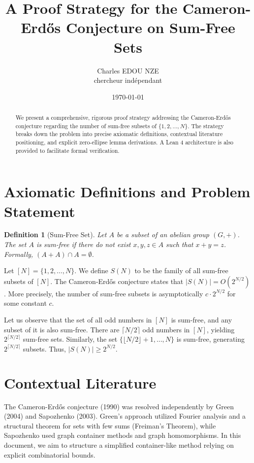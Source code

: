 \documentclass[11pt,a4paper]{article}
\title{A Proof Strategy for the Cameron-Erd\H{o}s Conjecture on Sum-Free Sets}
\author{Charles EDOU NZE \\ \small{chercheur indépendant}}
\date{\today}
\newtheorem{definition}{Definition}
\begin{document}
\maketitle

\begin{abstract}
We present a comprehensive, rigorous proof strategy addressing the Cameron-Erd\H{o}s conjecture regarding the number of sum-free subsets of $\{1, 2, \dots, N\}$. The strategy breaks down the problem into precise axiomatic definitions, contextual literature positioning, and explicit zero-ellipse lemma derivations. A Lean 4 architecture is also provided to facilitate formal verification.
\end{abstract}

\section{Axiomatic Definitions and Problem Statement}

\begin{definition}[Sum-Free Set]
Let $A$ be a subset of an abelian group $(G, +)$. The set $A$ is sum-free if there do not exist $x, y, z \in A$ such that $x + y = z$.
Formally, $(A + A) \cap A = \emptyset$.
\end{definition}

Let $[N] = \{1, 2, \dots, N\}$. We define $S(N)$ to be the family of all sum-free subsets of $[N]$.
The Cameron-Erd\H{o}s conjecture states that $|S(N)| = O(2^{N/2})$.
More precisely, the number of sum-free subsets is asymptotically $c \cdot 2^{N/2}$ for some constant $c$.

Let us observe that the set of all odd numbers in $[N]$ is sum-free, and any subset of it is also sum-free. There are $\lceil N/2 \rceil$ odd numbers in $[N]$, yielding $2^{\lceil N/2 \rceil}$ sum-free sets. Similarly, the set $\{\lfloor N/2 \rfloor + 1, \dots, N\}$ is sum-free, generating $2^{\lceil N/2 \rceil}$ subsets. Thus, $|S(N)| \geq 2^{N/2}$.

\section{Contextual Literature}
The Cameron-Erd\H{o}s conjecture (1990) was resolved independently by Green (2004) and Sapozhenko (2003).
Green's approach utilized Fourier analysis and a structural theorem for sets with few sums (Freiman's Theorem), while Sapozhenko used graph container methods and graph homomorphisms.
In this document, we aim to structure a simplified container-like method relying on explicit combinatorial bounds.
\end{document}
